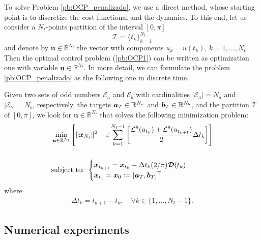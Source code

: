 \documentclass[twocolumn]{autart}    %
\begin{document}
To solve Problem \ref{pb:OCP_penalizado}, we use a direct method, whose starting point is to discretize the cost functional and the dynamics. To this end, let us consider a $N_t$-points partition of the interval $[0,\pi]$ 
\begin{displaymath} 
	\mathcal{T} = \{t_k\}_{k=1}^{N_t} 
\end{displaymath}
and denote by $\bm{u} \in \mathbb{R}^{N_t}$ the vector with components $u_k = u(t_k)$, $k=1,\ldots,N_t$. Then the optimal control problem (\ref{pb:OCP1}) can be written as optimization one with variable $\bm{u} \in \mathbb{R}^{N_t}$. In more detail, we can formulate the problem \ref{pb:OCP_penalizado} as the following one in discrete time.

\vspace{0.5em}
\begin{problem}\label{pb:numOCP2}
	Given two sets of odd numbers $\mathcal{E}_a$ and $\mathcal{E}_b$ with cardinalities $|\mathcal{E}_a| = N_a$ and $|\mathcal{E}_b| = N_b$, respectively, the targets $\bm{a}_T \in \mathbb{R}^{N_a}$ and $\bm{b}_T \in \mathbb{R}^{N_b}$, and the partition $\mathcal{T}$ of $[0,\pi]$, we look for $\bm{u} \in \mathbb{R}^{N_t}$ that solves the following minimization problem:
	\begin{align*}
		&\min_{\bm{u} \in \mathbb{R}^{N_t}} \Bigg[\| \bm{x}_{N_t}\|^2 + \varepsilon \sum_{k=1}^{N_t-1} 
		\bigg[\frac{\mathcal{L}^\theta(u_{t_k}) + \mathcal{L}^\theta(u_{t_{k+1}})}{2}\Delta t_k \bigg]  \Bigg]  
		\\[15pt]
		&\notag \text{subject to: } \begin{cases}
			\bm{x}_{t_{k+1}} = \bm{x}_{t_k} - \Delta t_{k} (2/\pi) \bm{\mathcal{D}}(t_k)\\
			\bm{x}_{t_1} = \bm{x}_0:= [\bm{a}_T,\bm{b}_T]^\top
		\end{cases} 
	\end{align*}
	where 
	\begin{gather}
		\Delta t_{k} = t_{k+1} - t_{k}, \hspace{1em} \forall k \in \{1,\dots,N_t-1\}.
	\end{gather}
\end{problem}

\subsection{Numerical experiments}
\end{document}
